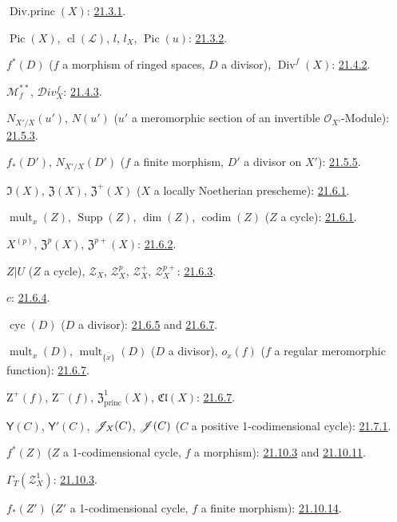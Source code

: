 $\operatorname{Div.princ}(X)$: {\hyperref[IV.21.3.1]{21.3.1}}.

$\operatorname{Pic}(X)$, $\operatorname{cl}(\mathcal L)$, $l$, $l_X$,
$\operatorname{Pic}(u)$: {\hyperref[IV.21.3.2]{21.3.2}}.

$f^*(D)$ ($f$ a morphism of ringed spaces, $D$ a divisor),
$\operatorname{Div}^f(X)$: {\hyperref[IV.21.4.2]{21.4.2}}.

$\mathcal M_f^{**}$, $\mathcal{D}iv_X^f$: {\hyperref[IV.21.4.3]{21.4.3}}.

$N_{X'/X}(u')$, $N(u')$
($u'$ a meromorphic section of an invertible $\mathcal O_{X'}$-Module):
{\hyperref[IV.21.5.3]{21.5.3}}.

$f_*(D')$, $N_{X'/X}(D')$
($f$ a finite morphism, $D'$ a divisor on $X'$): {\hyperref[IV.21.5.5]{21.5.5}}.

$\mathfrak I(X)$, $\mathfrak Z(X)$, $\mathfrak Z^+(X)$
($X$ a locally Noetherian prescheme): {\hyperref[IV.21.6.1]{21.6.1}}.

$\operatorname{mult}_x(Z)$, $\operatorname{Supp}(Z)$,
$\dim(Z)$, $\operatorname{codim}(Z)$ ($Z$ a cycle): {\hyperref[IV.21.6.1]{21.6.1}}.

$X^{(p)}$, $\mathfrak Z^p(X)$, $\mathfrak Z^{p+}(X)$:
{\hyperref[IV.21.6.2]{21.6.2}}.

$Z|U$ ($Z$ a cycle), $\mathscr Z_X$, $\mathscr Z_X^p$, $\mathscr Z_X^+$,
$\mathscr Z_X^{p+}$: {\hyperref[IV.21.6.3]{21.6.3}}.

$c$: {\hyperref[IV.21.6.4]{21.6.4}}.

$\operatorname{cyc}(D)$ ($D$ a divisor): {\hyperref[IV.21.6.5]{21.6.5}} and
{\hyperref[IV.21.6.7]{21.6.7}}.

$\operatorname{mult}_x(D)$, $\operatorname{mult}_{\overline{\{x\}}}(D)$
($D$ a divisor), $o_x(f)$ ($f$ a regular meromorphic function):
{\hyperref[IV.21.6.7]{21.6.7}}.

$\mathrm Z^+(f)$, $\mathrm Z^-(f)$, $\mathfrak Z^1_{\mathrm{princ}}(X)$,
$\mathfrak{Cl}(X)$: {\hyperref[IV.21.6.7]{21.6.7}}.

$\boldsymbol{\mathsf{Y}}(C)$, $\boldsymbol{\mathsf{Y}}'(C)$, $\mathscr{J}_X(C)$, $\mathscr{J}(C)$
($C$ a positive 1-codimensional cycle): {\hyperref[IV.21.7.1]{21.7.1}}.

$f^*(Z)$ ($Z$ a 1-codimensional cycle, $f$ a morphism):
{\hyperref[IV.21.10.3]{21.10.3}} and {\hyperref[IV.21.10.11]{21.10.11}}.

$\varGamma_T(\mathscr Z_X^1)$: {\hyperref[IV.21.10.3]{21.10.3}}.

$f_*(Z')$ ($Z'$ a 1-codimensional cycle, $f$ a finite morphism):
{\hyperref[IV.21.10.14]{21.10.14}}.

